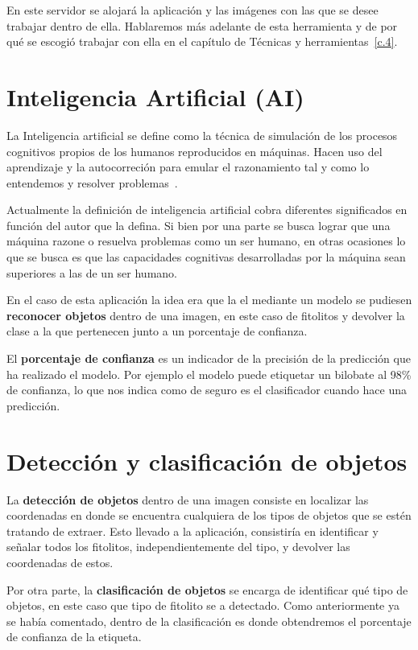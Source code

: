 En este servidor se alojará la aplicación y las imágenes con las que se desee trabajar dentro de ella. Hablaremos más adelante de esta herramienta y de por qué se escogió trabajar con ella en el capítulo de Técnicas y herramientas~\ref{c.4}.


\section{Inteligencia Artificial (AI)}

La Inteligencia artificial se define como la técnica de simulación de los procesos cognitivos propios de los humanos reproducidos en máquinas. Hacen uso del aprendizaje y la autocorreción para emular el razonamiento tal y como lo entendemos y resolver problemas~\cite{ai}. 

Actualmente la definición de inteligencia artificial cobra diferentes significados en función del autor que la defina. Si bien por una parte se busca lograr que una máquina razone o resuelva problemas como un ser humano, en otras ocasiones lo que se busca es que las capacidades cognitivas desarrolladas por la máquina sean superiores a las de un ser humano. 

En el caso de esta aplicación la idea era que la el mediante un modelo se pudiesen \textbf{reconocer objetos} dentro de una imagen, en este caso de fitolitos y devolver la clase a la que pertenecen junto a un porcentaje de confianza.

El \textbf{porcentaje de confianza} es un indicador de la precisión de la predicción que ha realizado el modelo. Por ejemplo el modelo puede etiquetar un bilobate al 98\% de confianza, lo que nos indica como de seguro es el clasificador cuando hace una predicción.
\section{Detección y clasificación de objetos}

La \textbf{detección de objetos} dentro de una imagen consiste en localizar las coordenadas en donde se encuentra cualquiera de los tipos de objetos que se estén tratando de extraer. Esto llevado a la aplicación, consistiría en identificar y señalar todos los fitolitos, independientemente del tipo, y devolver las coordenadas de estos. 

Por otra parte, la \textbf{clasificación de objetos} se encarga de identificar qué tipo de objetos, en este caso que tipo de fitolito se a detectado. Como anteriormente ya se había comentado, dentro de la clasificación es donde obtendremos el porcentaje de confianza de la etiqueta.

